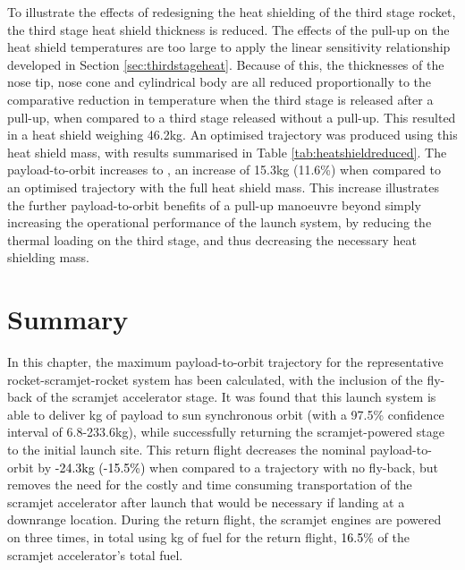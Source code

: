 To illustrate the effects of redesigning the heat shielding of the third stage rocket, the third stage heat shield thickness is reduced. The effects of the pull-up on the heat shield temperatures are too large to apply the linear sensitivity relationship developed in Section \ref{sec:thirdstageheat}. Because of this, the thicknesses of the nose tip, nose cone and cylindrical body are all reduced proportionally to the comparative reduction in temperature when the third stage is released after a pull-up, when compared to a third stage released without a pull-up. This resulted in a heat shield weighing 46.2kg. An optimised trajectory was produced using this heat shield mass, with results summarised in Table \ref{tab:heatshieldreduced}. The payload-to-orbit increases to \PayloadToOrbitTPSreduced, an increase of 15.3kg (11.6\%) when compared to an optimised trajectory with the full heat shield mass. This increase illustrates the further payload-to-orbit benefits of a pull-up manoeuvre beyond simply increasing the operational performance of the launch system, by reducing the thermal loading on the third stage, and thus decreasing the necessary heat shielding mass. 

%
%
%
%
%
%
%
%
%
%
%
%
%
%
%
%
%

\FloatBarrier
\section{Summary}
In this chapter, the maximum payload-to-orbit trajectory for the representative rocket-scramjet-rocket system has been calculated, with the inclusion of the fly-back of the scramjet accelerator stage. It was found that this launch system is able to deliver \PayloadToOrbitStandard kg of payload to sun synchronous orbit (with a 97.5\% confidence interval of 6.8-233.6kg), while successfully returning the scramjet-powered stage to the initial launch site. 
This return flight decreases the nominal payload-to-orbit by \textcolor{black}{-24.3kg (-15.5\%)} when compared to a trajectory with no fly-back, but removes the need for the costly and time consuming transportation of the scramjet accelerator after launch that would be necessary if landing at a downrange location.
During the return flight, the scramjet engines are powered on three times, in total using \returnFuelStandard kg of fuel for the return flight, \textcolor{black}{16.5}\% of the scramjet accelerator's total fuel.

